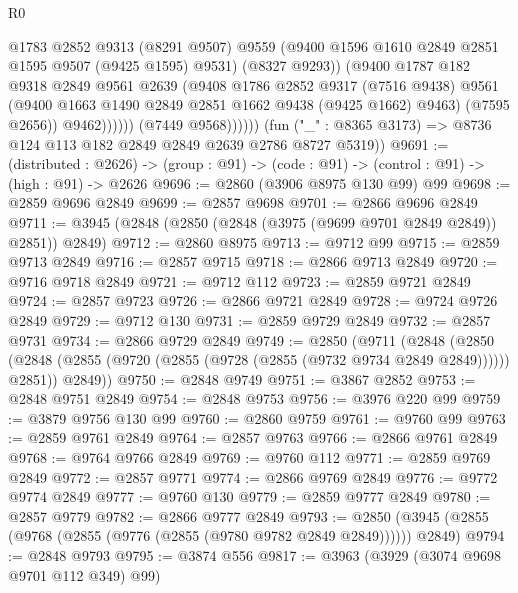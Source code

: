 \begin{lexlean}{R0}
\begin{coremodule}
                            @1783
                            @2852
                            @9313
                            (@8291 @9507)
                            @9559
                            (@9400 @1596 @1610 @2849 @2851 @1595 @9507 (@9425 @1595) @9531)
                            (@8327 @9293))
                          (@9400
                            @1787
                            @182
                            @9318
                            @2849
                            @9561
                            @2639
                            (@9408
                              @1786
                              @2852
                              @9317
                              (@7516 @9438)
                              @9561
                              (@9400 @1663 @1490 @2849 @2851 @1662 @9438 (@9425 @1662) @9463)
                              (@7595 @2656))
                            @9462))))))
                (@7449 @9568))))))
      (fun ("_" : @8365 @3173) => @8736 @124 @113 @182 @2849 @2849 @2639 @2786 @8727 @5319))
@9691 := (distributed : @2626) ->
  (group : @91) -> (code : @91) -> (control : @91) -> (high : @91) -> @2626
@9696 := @2860 (@3906 @8975 @130 @99) @99
@9698 := @2859 @9696 @2849
@9699 := @2857 @9698
@9701 := @2866 @9696 @2849
@9711 := @3945 (@2848 (@2850 (@2848 (@3975 (@9699 @9701 @2849 @2849)) @2851)) @2849)
@9712 := @2860 @8975
@9713 := @9712 @99
@9715 := @2859 @9713 @2849
@9716 := @2857 @9715
@9718 := @2866 @9713 @2849
@9720 := @9716 @9718 @2849
@9721 := @9712 @112
@9723 := @2859 @9721 @2849
@9724 := @2857 @9723
@9726 := @2866 @9721 @2849
@9728 := @9724 @9726 @2849
@9729 := @9712 @130
@9731 := @2859 @9729 @2849
@9732 := @2857 @9731
@9734 := @2866 @9729 @2849
@9749 := @2850
    (@9711
      (@2848
        (@2850 (@2848 (@2855 (@9720 (@2855 (@9728 (@2855 (@9732 @9734 @2849 @2849)))))) @2851))
        @2849))
@9750 := @2848 @9749
@9751 := @3867 @2852
@9753 := @2848 @9751 @2849
@9754 := @2848 @9753
@9756 := @3976 @220 @99
@9759 := @3879 @9756 @130 @99
@9760 := @2860 @9759
@9761 := @9760 @99
@9763 := @2859 @9761 @2849
@9764 := @2857 @9763
@9766 := @2866 @9761 @2849
@9768 := @9764 @9766 @2849
@9769 := @9760 @112
@9771 := @2859 @9769 @2849
@9772 := @2857 @9771
@9774 := @2866 @9769 @2849
@9776 := @9772 @9774 @2849
@9777 := @9760 @130
@9779 := @2859 @9777 @2849
@9780 := @2857 @9779
@9782 := @2866 @9777 @2849
@9793 := @2850 (@3945 (@2855 (@9768 (@2855 (@9776 (@2855 (@9780 @9782 @2849 @2849)))))) @2849)
@9794 := @2848 @9793
@9795 := @3874 @556
@9817 := @3963
    (@3929 (@3074 @9698 @9701 @112 @349) @99)

\end{coremodule}
\end{lexlean}

